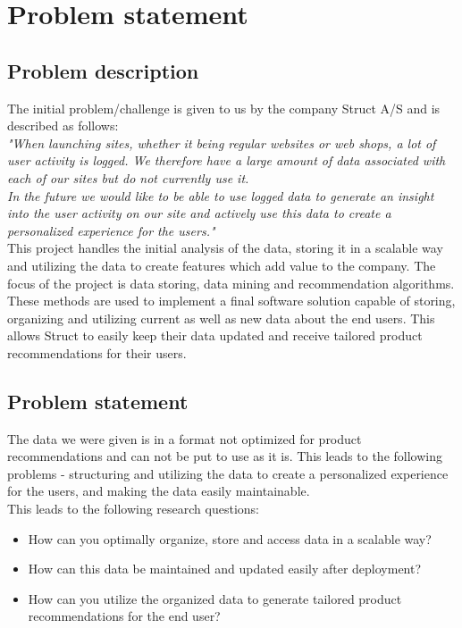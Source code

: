 
\chapter{Problem statement} %

\label{Chapter1} %


\section{Problem description}

The initial problem/challenge is given to us by the company Struct A/S and is described as follows: \\

\textit{"When launching sites, whether it being regular websites or web shops, a lot of user activity is logged. We therefore have a large amount of data associated with each of our sites but do not currently use it.} \\
\textit{In the future we would like to be able to use logged data to generate an insight into the user activity on our site and actively use this data to create a personalized experience for the users."} \\

This project handles the initial analysis of the data, storing it in a scalable way and utilizing the data to create features which add value to the company. The focus of the project is data storing, data mining and recommendation algorithms. These methods are used to implement a final software solution capable of storing, organizing and utilizing current as well as new data about the end users. This allows Struct to easily keep their data updated and receive tailored product recommendations for their users.





\section{Problem statement}
The data we were given is in a format not optimized for product recommendations and can not be put to use as it is. This leads to the following problems - structuring and utilizing the data to create a personalized experience for the users, and making the data easily maintainable. \\
This leads to the following research questions:
\begin{itemize}
\item How can you optimally organize, store and access data in a scalable way?
\item How can this data be maintained and updated easily after deployment?
\item How can you utilize the organized data to generate tailored product recommendations for the end user?
\end{itemize}
